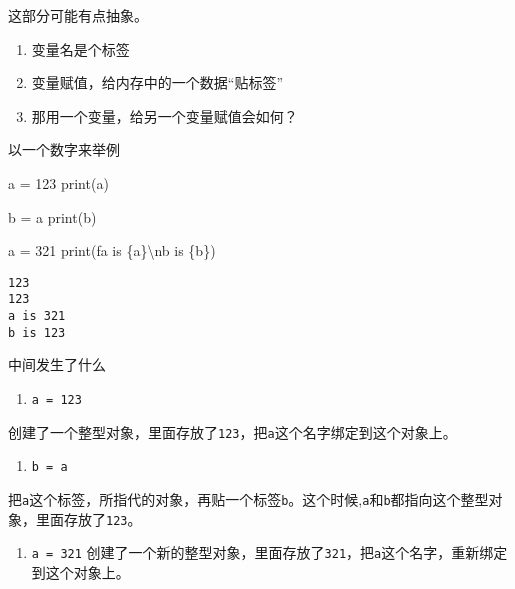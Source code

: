 \documentclass[
  letterpaper,
  DIV=11,
  numbers=noendperiod]{scrreprt}
\newenvironment{Shaded}{\begin{snugshade}}{\end{snugshade}}
\newcommand{\BuiltInTok}[1]{\textcolor[rgb]{0.00,0.23,0.31}{#1}}
\newcommand{\CharTok}[1]{\textcolor[rgb]{0.13,0.47,0.30}{#1}}
\newcommand{\DecValTok}[1]{\textcolor[rgb]{0.68,0.00,0.00}{#1}}
\newcommand{\NormalTok}[1]{\textcolor[rgb]{0.00,0.23,0.31}{#1}}
\newcommand{\OperatorTok}[1]{\textcolor[rgb]{0.37,0.37,0.37}{#1}}
\newcommand{\SpecialCharTok}[1]{\textcolor[rgb]{0.37,0.37,0.37}{#1}}
\newcommand{\SpecialStringTok}[1]{\textcolor[rgb]{0.13,0.47,0.30}{#1}}
\providecommand{\tightlist}{%
  \setlength{\itemsep}{0pt}\setlength{\parskip}{0pt}}\usepackage{longtable,booktabs,array}
\begin{document}
这部分可能有点抽象。

\begin{enumerate}
\def\labelenumi{\arabic{enumi}.}
\tightlist
\item
  变量名是个标签
\item
  变量赋值，给内存中的一个数据``贴标签''
\item
  那用一个变量，给另一个变量赋值会如何？
\end{enumerate}

以一个数字来举例

\begin{Shaded}
\begin{Highlighting}[]
\NormalTok{a }\OperatorTok{=} \DecValTok{123}
\BuiltInTok{print}\NormalTok{(a)}

\NormalTok{b }\OperatorTok{=}\NormalTok{ a }
\BuiltInTok{print}\NormalTok{(b)}

\NormalTok{a }\OperatorTok{=} \DecValTok{321}
\BuiltInTok{print}\NormalTok{(}\SpecialStringTok{f\textquotesingle{}a is }\SpecialCharTok{\{}\NormalTok{a}\SpecialCharTok{\}}\CharTok{\textbackslash{}n}\SpecialStringTok{b is }\SpecialCharTok{\{}\NormalTok{b}\SpecialCharTok{\}}\SpecialStringTok{\textquotesingle{}}\NormalTok{)}
\end{Highlighting}
\end{Shaded}

\begin{verbatim}
123
123
a is 321
b is 123
\end{verbatim}

中间发生了什么

\begin{enumerate}
\def\labelenumi{\arabic{enumi}.}
\tightlist
\item
  \texttt{a\ =\ 123}
\end{enumerate}

创建了一个整型对象，里面存放了\texttt{123}，把\texttt{a}这个名字绑定到这个对象上。

\begin{enumerate}
\def\labelenumi{\arabic{enumi}.}
\setcounter{enumi}{1}
\tightlist
\item
  \texttt{b\ =\ a}
\end{enumerate}

把\texttt{a}这个标签，所指代的对象，再贴一个标签\texttt{b}。这个时候,\texttt{a}和\texttt{b}都指向这个整型对象，里面存放了\texttt{123}。

\begin{enumerate}
\def\labelenumi{\arabic{enumi}.}
\setcounter{enumi}{2}
\tightlist
\item
  \texttt{a\ =\ 321}
  创建了一个新的整型对象，里面存放了\texttt{321}，把\texttt{a}这个名字，重新绑定到这个对象上。
\end{enumerate}
\end{document}
